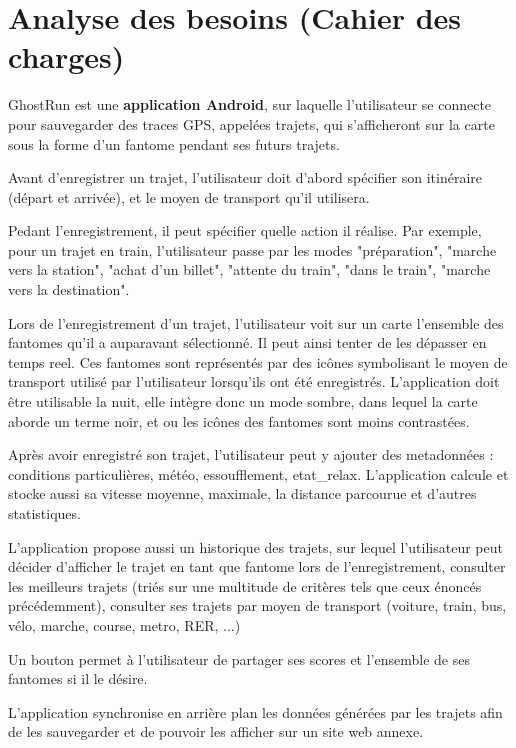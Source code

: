 \chapter{Analyse des besoins (Cahier des charges)}

GhostRun est une \textbf{application Android}, sur laquelle l'utilisateur se connecte pour sauvegarder des traces GPS, appelées trajets, qui s'afficheront sur la carte sous la forme d'un \gls{fantome} pendant ses futurs trajets.

Avant d'enregistrer un trajet, l'utilisateur doit d'abord spécifier son itinéraire (départ et arrivée), et le moyen de transport qu'il utilisera. 

Pedant l'enregistrement, il peut spécifier quelle action il réalise. Par exemple, pour un trajet en train, l'utilisateur passe par les modes "préparation", "marche vers la station", "achat d'un billet", "attente du train", "dans le train", "marche vers la destination".

Lors de l'enregistrement d'un trajet, l'utilisateur voit sur un carte l'ensemble des \glspl{fantome} qu'il a auparavant sélectionné. Il peut ainsi tenter de les dépasser en temps reel. Ces \glspl{fantome} sont représentés par des icônes symbolisant le moyen de transport utilisé par l'utilisateur lorsqu'ils ont été enregistrés. L'application doit être utilisable la nuit, elle intègre donc un mode sombre, dans lequel la carte aborde un terme noir, et ou les icônes des \glspl{fantome} sont moins contrastées.

Après avoir enregistré son trajet, l'utilisateur peut y ajouter des metadonnées : conditions particulières, météo, essoufflement, \gls{etat_relax}. L'application calcule et stocke aussi sa vitesse moyenne, maximale, la distance parcourue et d'autres statistiques.

L'application propose aussi un historique des trajets, sur lequel l'utilisateur peut décider d'afficher le trajet en tant que \gls{fantome} lors de l'enregistrement, consulter les meilleurs trajets (triés sur une multitude de critères tels que ceux énoncés précédemment), consulter ses trajets par moyen de transport (voiture, train, bus, vélo, marche, course, metro, RER, ...)

Un bouton permet à l'utilisateur de partager ses scores et l'ensemble de ses \glspl{fantome} si il le désire.

L'application synchronise en arrière plan les données générées par les trajets afin de les sauvegarder et de pouvoir les afficher sur un site web annexe.

